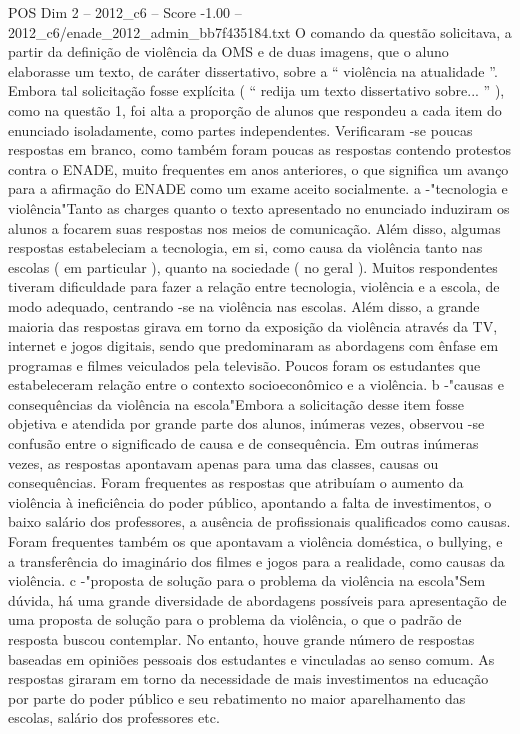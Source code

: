 \begin{textsample}{POS Dim 2 – 2012\_c6 – Score -1.00 – 2012\_c6/enade\_2012\_admin\_bb7f435184.txt}
O comando da questão solicitava, a partir da definição de violência da OMS e de duas imagens, que o aluno elaborasse um texto, de caráter dissertativo, sobre a “ violência na atualidade ”.
Embora tal solicitação fosse explícita ( “ redija um texto dissertativo sobre... ” ), como na questão 1, foi alta a proporção de alunos que respondeu a cada item do enunciado isoladamente, como partes independentes.
Verificaram -se poucas respostas em branco, como também foram poucas as respostas contendo protestos contra o ENADE, muito frequentes em anos anteriores, o que significa um avanço para a afirmação do ENADE como um exame aceito socialmente. a -"tecnologia e violência"Tanto as charges quanto o texto apresentado no enunciado induziram os alunos a focarem suas respostas nos meios de comunicação.
Além disso, algumas respostas estabeleciam a tecnologia, em si, como causa da violência tanto nas escolas ( em particular ), quanto na sociedade ( no geral ).
Muitos respondentes tiveram dificuldade para fazer a relação entre tecnologia, violência e a escola, de modo adequado, centrando -se na violência nas escolas.
Além disso, a grande maioria das respostas girava em torno da exposição da violência através da TV, internet e jogos digitais, sendo que predominaram as abordagens com ênfase em programas e filmes veiculados pela televisão.
Poucos foram os estudantes que estabeleceram relação entre o contexto socioeconômico e a violência. b -"causas e consequências da violência na escola"Embora a solicitação desse item fosse objetiva e atendida por grande parte dos alunos, inúmeras vezes, observou -se confusão entre o significado de causa e de consequência.
Em outras inúmeras vezes, as respostas apontavam apenas para uma das classes, causas ou consequências.
Foram frequentes as respostas que atribuíam o aumento da violência à ineficiência do poder público, apontando a falta de investimentos, o baixo salário dos professores, a ausência de profissionais qualificados como causas.
Foram frequentes também os que apontavam a violência doméstica, o bullying, e a transferência do imaginário dos filmes e jogos para a realidade, como causas da violência. c -"proposta de solução para o problema da violência na escola"Sem dúvida, há uma grande diversidade de abordagens possíveis para apresentação de uma proposta de solução para o problema da violência, o que o padrão de resposta buscou contemplar.
No entanto, houve grande número de respostas baseadas em opiniões pessoais dos estudantes e vinculadas ao senso comum.
As respostas giraram em torno da necessidade de mais investimentos na educação por parte do poder público e seu rebatimento no maior aparelhamento das escolas, salário dos professores etc.

\end{textsample}
